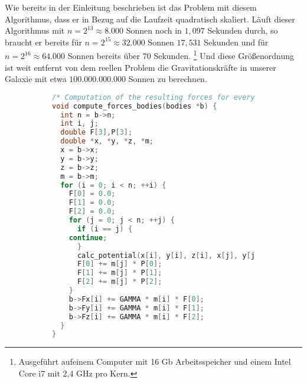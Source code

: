     Wie bereits in der Einleitung beschrieben ist das Problem mit diesem Algorithmus, dass er in Bezug auf die Laufzeit quadratisch skaliert. Läuft dieser Algorithmus mit $n = 2^{13} \approx 8.000$
    Sonnen noch in $1,097$ Sekunden durch, so braucht er bereits für $n = 2^{15} \approx 32.000$ Sonnen $17,531$ Sekunden und für $n = 2^{16} \approx 64.000$ Sonnen bereits über $70$ Sekunden.
    \footnote{Ausgeführt aufeinem Computer mit 16 Gb Arbeitsspeicher und einem Intel Core i7 mit 2,4 GHz pro Kern.} 
    Und diese Größenordnung ist weit entfernt von dem reellen Problem die Gravitationskräfte in unserer Galaxie mit etwa $100.000.000.000$ Sonnen zu berechnen.
    
    \begin{figure}[b]
    \centering
    \begin{subfigure}{0.9\textwidth}
    \begin{lstlisting}[language=C, label=lst:compfbodies,caption={Diese Methode berechnet die auftretenden Gravitationskräfte.}]
/* Computation of the resulting forces for every particle.*/
void compute_forces_bodies(bodies *b) {
  int n = b->n;
  int i, j;
  double F[3],P[3];
  double *x, *y, *z, *m;
  x = b->x;
  y = b->y;
  z = b->z;
  m = b->m;
  for (i = 0; i < n; ++i) {
    F[0] = 0.0;
    F[1] = 0.0;
    F[2] = 0.0;
    for (j = 0; j < n; ++j) {
      if (i == j) {
	continue;
      }
      calc_potential(x[i], y[i], z[i], x[j], y[j], z[j], P);
      F[0] += m[j] * P[0];
      F[1] += m[j] * P[1];
      F[2] += m[j] * P[2];
    }
    b->Fx[i] += GAMMA * m[i] * F[0];
    b->Fy[i] += GAMMA * m[i] * F[1];
    b->Fz[i] += GAMMA * m[i] * F[2];
  }
}
    \end{lstlisting}
    \end{subfigure}
    \end{figure}
    
    
